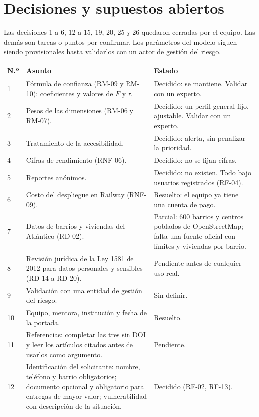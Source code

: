 \section{Decisiones y supuestos abiertos}\label{sec:pendientes}

Las decisiones 1 a 6, 12 a 15, 19, 20, 25 y 26 quedaron cerradas por el equipo. Las demás son tareas o puntos por confirmar. Los parámetros del modelo siguen siendo provisionales hasta validarlos con un actor de gestión del riesgo.

\begin{longtable}{@{}p{0.9cm}p{8cm}p{4.2cm}@{}}
\toprule
\textbf{N.º} & \textbf{Asunto} & \textbf{Estado} \\
\midrule
\endhead
1 & Fórmula de confianza (RM-09 y RM-10): coeficientes y valores de $F$ y $\tau$. & Decidido: se mantiene. Validar con un experto. \\
2 & Pesos de las dimensiones (RM-06 y RM-07). & Decidido: un perfil general fijo, ajustable. Validar con un experto. \\
3 & Tratamiento de la accesibilidad. & Decidido: alerta, sin penalizar la prioridad. \\
4 & Cifras de rendimiento (RNF-06). & Decidido: no se fijan cifras. \\
5 & Reportes anónimos. & Decidido: no existen. Todo bajo usuarios registrados (RF-04). \\
6 & Costo del despliegue en Railway (RNF-09). & Resuelto: el equipo ya tiene una cuenta de pago. \\
7 & Datos de barrios y viviendas del Atlántico (RD-02). & Parcial: 600 barrios y centros poblados de OpenStreetMap; falta una fuente oficial con límites y viviendas por barrio. \\
8 & Revisión jurídica de la Ley 1581 de 2012 para datos personales y sensibles (RD-14 a RD-20). & Pendiente antes de cualquier uso real. \\
9 & Validación con una entidad de gestión del riesgo. & Sin definir. \\
10 & Equipo, mentora, institución y fecha de la portada. & Resuelto. \\
11 & Referencias: completar las tres sin DOI y leer los artículos citados antes de usarlos como argumento. & Pendiente. \\
12 & Identificación del solicitante: nombre, teléfono y barrio obligatorios; documento opcional y obligatorio para entregas de mayor valor; vulnerabilidad con descripción de la situación. & Decidido (RF-02, RF-13). \\

\end{longtable}
